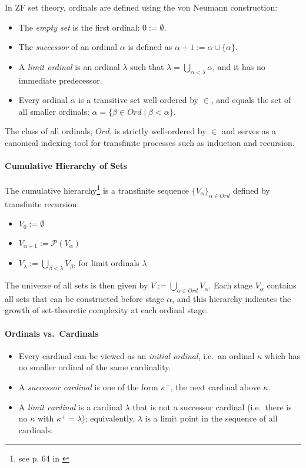 In ZF set theory, ordinals are defined using the von Neumann construction:

\begin{itemize}
  \item The \emph{empty set} is the first ordinal: $0 := \emptyset$.
  \item The \emph{successor} of an ordinal $\alpha$ is defined as $\alpha + 1 := \alpha \cup \{\alpha\}$.
  \item A \emph{limit ordinal} is an ordinal $\lambda$ such that $\lambda = \bigcup_{\alpha < \lambda} \alpha$, and it has no immediate predecessor.
  \item Every ordinal $\alpha$ is a transitive set well-ordered by $\in$, and equals the set of all smaller ordinals: $\alpha = \{\beta \in Ord \mid \beta < \alpha\}$.
\end{itemize}

The class of all ordinals, $Ord$, is strictly well-ordered by $\in$ and serves as a canonical indexing tool for transfinite processes such as induction and recursion.

\paragraph{Cumulative Hierarchy of Sets}

The cumulative hierarchy\footnote{see p. 64 in \cite{jech2003set}} is a transfinite sequence $\{V_\alpha\}_{\alpha \in Ord}$ defined by transfinite recursion:

\begin{itemize}
  \item $V_0 := \emptyset$
  \item $V_{\alpha+1} := \mathcal{P}(V_\alpha)$
  \item $V_\lambda := \bigcup_{\beta < \lambda} V_\beta$, for limit ordinals $\lambda$
\end{itemize}

The universe of all sets is then given by $V := \bigcup_{\alpha \in Ord} V_\alpha$. Each stage $V_\alpha$ contains all sets that can be constructed before stage $\alpha$, and this hierarchy indicates the growth of set-theoretic complexity at each ordinal stage.

\paragraph{Ordinals vs.\ Cardinals}

\begin{itemize}
  \item Every cardinal can be viewed as an \emph{initial ordinal}, i.e.\ an ordinal $\kappa$ which has no smaller ordinal of the same cardinality.
  \item A \emph{successor cardinal} is one of the form $\kappa^+$, the next cardinal above $\kappa$.
  \item A \emph{limit cardinal} is a cardinal $\lambda$ that is not a successor cardinal (i.e.\ there is no $\kappa$ with $\kappa^+ = \lambda$); equivalently, $\lambda$ is a limit point in the sequence of all cardinals.
\end{itemize}

